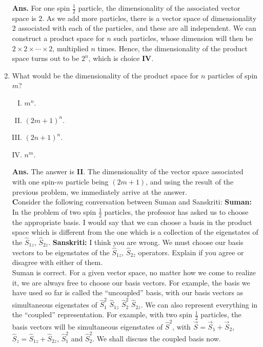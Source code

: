 \documentclass[12pt]{article}
\newcommand\half{\frac{1}{2}}
\newcommand\hs{\hat{S}}
\begin{document}
\begin{enumerate}[1.]
\textbf{Ans.} For one spin $\half$ particle, the dimensionality of the associated vector space is $2$. As we add more particles, there is a vector space of dimensionality $2$ associated with each of the particles, and these are all independent. We can construct a product space for $n$ such particles, whose dimension will then be $ 2 \times 2 \times \cdots \times 2 $, multiplied $n$ times. Hence, the dimensionality of the product space turns out to be $2^n$, which is choice \textbf{IV}.
\item What would be the dimensionality of the product space for $n$ particles of spin $m$?
       \begin{enumerate}[I.]
              \item $m^n$.
              \item $(2m+1)^n$.
              \item $(2n+1)^n$.
              \item $n^m$. \\ \newline
       \end{enumerate}
\textbf{Ans.} The answer is \textbf{II}. The dimensionality of the vector space associated with one spin-$m$ particle being $(2m+1)$, and using the result of the previous problem, we immediately arrive at the answer. \\ \newline
\textbf{C}onsider the following conversation between Suman and Sanskriti: \newline
\textbf{Suman:} In the problem of two spin $\half$ particles, the professor has asked us to choose the appropriate basis. I would say that we can choose a basis in the product space which is different from the one which is a collection of the eigenstates of the $\hs_{1z}$, $\hs_{2z}$. \newline
\textbf{Sanskriti:} I think you are wrong. We must choose our basis vectors to be eigenstates of the $\hs_{1z}$, $\hs_{2z}$ operators. \newline
Explain if you agree or disagree with either of them. \\ \newline
Suman is correct. For a given vector space, no matter how we come to realize it, we are always free to choose our basis vectors. For example, the basis we have used so far is called the ``uncoupled'' basis, with our basis vectors as simultaneous eigenstates of $\hs_{1}^2$ $\hs_{1z}$ $\hs_{2}^2$ $\hs_{2z}$. We can also represent everything in the ``coupled'' representation. For example, with two spin $\half$ particles, the basis vectors will be simultaneous eigenstates of $\hs^2$, with $\vec{S}=\vec{S}_1 + \vec{S}_2$, $\hs_z = \hs_{1z} + \hs_{2z}$, $\hs_1^2$ and $\hs_2^2$. We shall discuss the coupled basis now. \\ \newline

\end{enumerate}
\end{document}
